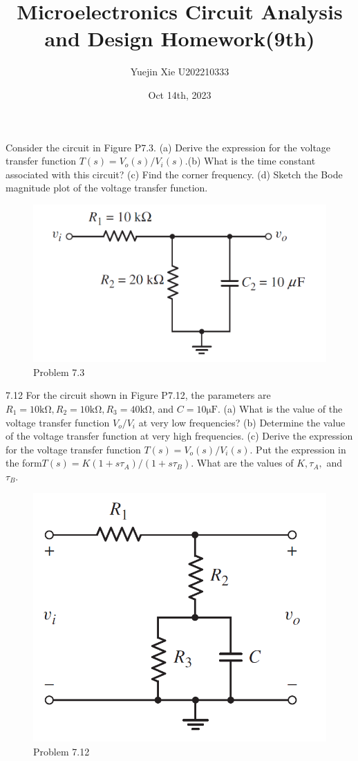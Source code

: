 \documentclass[a4paper,11pt,UTF8]{article}
\title{Microelectronics Circuit Analysis and Design Homework(9th)}
\author{Yuejin Xie \quad U202210333}
\date{Oct 14th, 2023}
\begin{document}
 Consider the circuit in Figure P7.3. (a) Derive the expression for the voltage transfer function $T(s) = V_o(s)/V_i (s)$.(b) What is the time constant associated with this circuit? (c) Find the corner frequency. (d) Sketch the Bode magnitude plot of the voltage transfer function.
\begin{figure}[H]
	\centering
	\includegraphics[scale=0.3]{MD7.3}
	\caption{Problem 7.3}
\end{figure}
7.12 For the circuit shown in Figure P7.12, the parameters are $R_1 = 10 \mathrm{k\Omega},
R_2 = 10 \mathrm{k\Omega}, R_3 = 40 \mathrm{k\Omega}$, and $C = 10\mathrm{\mu F}$. (a) What is the value of the voltage
transfer function $V_o/V_i$ at very low frequencies? (b) Determine the value of the voltage transfer function at very high frequencies. (c) Derive the expression for the voltage transfer function $T (s) = V_o(s)/V_i(s)$. Put the expression in the form$ T(s) = K(1 + s\tau_A)/(1 + s\tau_B)$. What are the values
of $K, \tau_A,$ and $\tau_B$.
\begin{figure}[H]
	\centering
	\includegraphics[scale=0.3]{MD7.12}
	\caption{Problem 7.12}
\end{figure}
\end{document}
